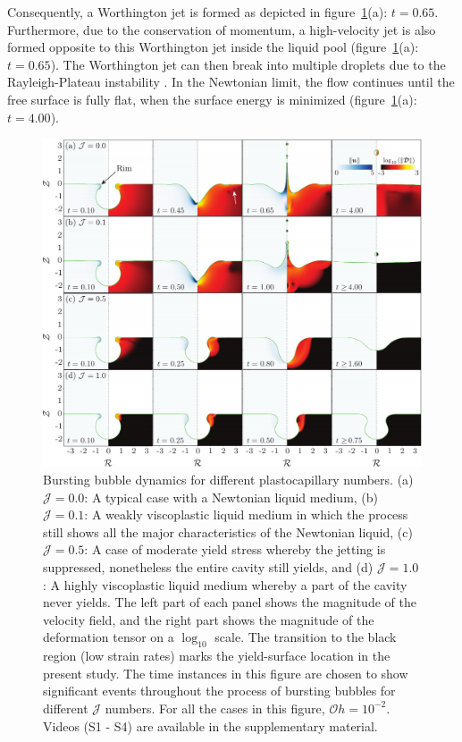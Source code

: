 \documentclass[final]{jfm}
\begin{document}
Consequently, a Worthington jet is formed as depicted in figure~\ref{fig:J_Variation}(a): $t = 0.65$. Furthermore, due to the conservation of momentum, a high-velocity jet is also formed opposite to this Worthington jet inside the liquid pool (figure~\ref{fig:J_Variation}(a): $t = 0.65$). The Worthington jet can then break into multiple droplets due to the Rayleigh-Plateau instability \citep{walls2015jet}. In the Newtonian limit, the flow continues until the free surface is fully flat, when the surface energy is minimized (figure~\ref{fig:J_Variation}(a): $t = 4.00$).
 \begin{figure}
	\centerline{\includegraphics[width=\linewidth]{Figure2_Jvariation-eps-converted-to.pdf}}%
	\caption{Bursting bubble dynamics for different plastocapillary numbers. (a) $\mathcal{J} = 0.0$: A typical case with a Newtonian liquid medium, (b) $\mathcal{J} =0.1$: A weakly viscoplastic liquid medium in which the process still shows all the major characteristics of the Newtonian liquid, (c) $\mathcal{J} = 0.5$: A case of moderate yield stress whereby the jetting is suppressed, nonetheless the entire cavity still yields, and (d) $\mathcal{J} = 1.0$: A highly viscoplastic liquid medium whereby a part of the cavity never yields. The left part of each panel shows the magnitude of the velocity field, and the right part shows the magnitude of the deformation tensor on a $\log_{10}$ scale. The transition to the black region (low strain rates) marks the yield-surface location in the present study. The time instances in this figure are chosen to show significant events throughout the process of bursting bubbles for different $\mathcal{J}$ numbers. For all the cases in this figure, $\mathcal{O}h = 10^{-2}$. Videos (S1 - S4) are available in the supplementary material.}
	\label{fig:J_Variation}
\end{figure}
\end{document}
